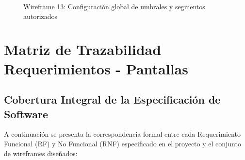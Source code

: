 \documentclass[12pt,a4paper]{report}
\begin{document}
\begin{figure}[htbp]
\caption{Wireframe 13: Configuración global de umbrales y segmentos autorizados}\label{fig:wf_configuracion}
\end{figure}

\newpage
\chapter{Matriz de Trazabilidad Requerimientos - Pantallas}

\section{Cobertura Integral de la Especificación de Software}

A continuación se presenta la correspondencia formal entre cada Requerimiento Funcional (RF) y No Funcional (RNF) especificado en el proyecto y el conjunto de wireframes diseñados:
\end{document}
